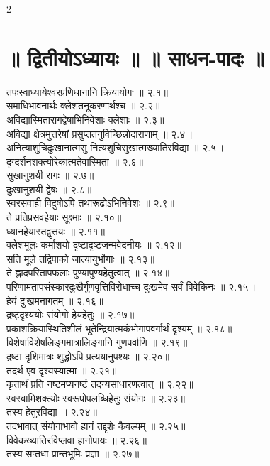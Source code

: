 \documentclass[9pt,a4paper,landscape]{article}
\begin{document}
\begin{multicols}{2}
\section*{॥ द्वितीयोऽध्यायः ॥  ॥ साधन-पादः ॥}
\begin{flushleft}
\devanagarifont
तपःस्वाध्यायेश्वरप्रणिधानानि क्रियायोगः ॥ २.१॥\\
समाधिभावनार्थः क्लेशतनूकरणार्थश्च ॥ २.२॥\\
अविद्यास्मितारागद्वेषाभिनिवेशाः क्लेशाः ॥ २.३॥\\
अविद्या क्षेत्रमुत्तरेषां प्रसुप्ततनुविच्छिन्नोदाराणाम् ॥ २.४॥\\
अनित्याशुचिदुःखानात्मसु नित्यशुचिसुखात्मख्यातिरविद्या ॥ २.५॥\\
दृग्दर्शनशक्त्योरेकात्मतेवास्मिता ॥ २.६॥\\
सुखानुशयी रागः ॥ २.७॥\\
दुःखानुशयी द्वेषः ॥ २.८॥\\
स्वरसवाही विदुषोऽपि तथारूढोऽभिनिवेशः ॥ २.९॥\\
ते प्रतिप्रसवहेयाः सूक्ष्माः ॥ २.१०॥\\
ध्यानहेयास्तद्वृत्तयः ॥ २.११॥\\
क्लेशमूलः कर्माशयो दृष्टादृष्टजन्मवेदनीयः ॥ २.१२॥\\
सति मूले तद्विपाको जात्यायुर्भोगाः ॥ २.१३॥\\
ते ह्लादपरितापफलाः पुण्यापुण्यहेतुत्वात् ॥ २.१४॥\\
परिणामतापसंस्कारदुःखैर्गुणवृत्तिविरोधाच्च दुःखमेव सर्वं विवेकिनः ॥ २.१५॥\\
हेयं दुःखमनागतम् ॥ २.१६॥\\
द्रष्टृदृश्ययोः संयोगो हेयहेतुः ॥ २.१७॥\\
प्रकाशक्रियास्थितिशीलं भूतेन्द्रियात्मकंभोगापवर्गार्थं दृश्यम् ॥ २.१८॥\\
विशेषाविशेषलिङ्गमात्रालिङ्गानि गुणपर्वाणि ॥ २.१९॥\\
द्रष्टा दृशिमात्रः शुद्धोऽपि प्रत्ययानुपश्यः ॥ २.२०॥\\
तदर्थ एव दृश्यस्यात्मा ॥ २.२१॥\\
कृतार्थं प्रति नष्टमप्यनष्टं तदन्यसाधारणत्वात् ॥ २.२२॥\\
स्वस्वामिशक्त्योः स्वरूपोपलब्धिहेतुः संयोगः ॥ २.२३॥\\
तस्य हेतुरविद्या ॥ २.२४॥\\
तदभावात् संयोगाभावो हानं तद्दृशेः कैवल्यम् ॥ २.२५॥\\
विवेकख्यातिरविप्लवा हानोपायः ॥ २.२६॥\\
तस्य सप्तधा प्रान्तभूमिः प्रज्ञा ॥ २.२७॥\\

\end{flushleft}
\end{multicols}
\end{document}
